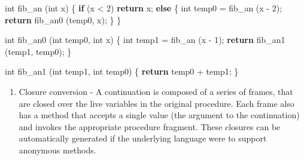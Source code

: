 \documentclass[12pt,a4paper,oneside,openright]{book}
\newenvironment{Shaded}{\begin{snugshade}}{\end{snugshade}}
\newcommand{\KeywordTok}[1]{\textcolor[rgb]{0.13,0.29,0.53}{\textbf{{#1}}}}
\newcommand{\DataTypeTok}[1]{\textcolor[rgb]{0.13,0.29,0.53}{{#1}}}
\newcommand{\DecValTok}[1]{\textcolor[rgb]{0.00,0.00,0.81}{{#1}}}
\newcommand{\FunctionTok}[1]{\textcolor[rgb]{0.00,0.00,0.00}{{#1}}}
\newcommand{\NormalTok}[1]{{#1}}
\providecommand{\tightlist}{%
  \setlength{\itemsep}{0pt}\setlength{\parskip}{0pt}}
\begin{document}
\begin{Shaded}
\begin{Highlighting}[]
    \DataTypeTok{int} \FunctionTok{fib_an} \NormalTok{(}\DataTypeTok{int} \NormalTok{x) \{}
        \KeywordTok{if} \NormalTok{(x < }\DecValTok{2}\NormalTok{)}
            \KeywordTok{return} \NormalTok{x;}
        \KeywordTok{else} \NormalTok{\{}
            \DataTypeTok{int} \NormalTok{temp0 = }\FunctionTok{fib_an} \NormalTok{(x - }\DecValTok{2}\NormalTok{);}
            \KeywordTok{return} \FunctionTok{fib_an0} \NormalTok{(temp0, x);}
        \NormalTok{\}}
    \NormalTok{\}}

    \DataTypeTok{int} \FunctionTok{fib_an0} \NormalTok{(}\DataTypeTok{int} \NormalTok{temp0, }\DataTypeTok{int} \NormalTok{x) \{}
        \DataTypeTok{int} \NormalTok{temp1 = }\FunctionTok{fib_an} \NormalTok{(x - }\DecValTok{1}\NormalTok{);}
        \KeywordTok{return} \FunctionTok{fib_an1} \NormalTok{(temp1, temp0);}
    \NormalTok{\}}

    \DataTypeTok{int} \FunctionTok{fib_an1} \NormalTok{(}\DataTypeTok{int} \NormalTok{temp1, }\DataTypeTok{int} \NormalTok{temp0) \{}
        \KeywordTok{return} \NormalTok{temp0 + temp1;}
    \NormalTok{\}}
\end{Highlighting}
\end{Shaded}

\begin{enumerate}
\def\labelenumi{\arabic{enumi}.}
\setcounter{enumi}{4}
\tightlist
\item
  Closure conversion - A continuation is composed of a series of frames,
  that are closed over the live variables in the original procedure.
  Each frame also has a method that accepts a single value (the argument
  to the continuation) and invokes the appropriate procedure fragment.
  These closures can be automatically generated if the underlying
  language were to support anonymous methods.
\end{enumerate}
\end{document}
